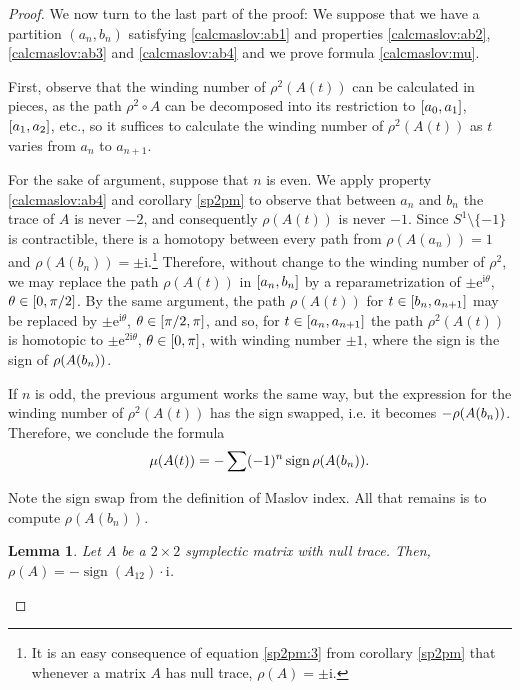 \documentclass{article}
\newtheorem{lemma}{Lemma}
\theoremstyle{nonumberplain}
\newtheorem{proof}{Proof}
\newcommand{\I}{\mathrm{i}}
\newcommand{\e}{\mathrm{e}}
\DeclareMathOperator{\sign}{sign}
\let\Im\relax
\DeclareMathOperator{\Im}{Im}
\begin{document}
\begin{proof}
\smallskip

We now turn to the last part of the proof: We suppose that we have a partition $(a_n, b_n)$ satisfying \eqref{calcmaslov:ab1} and properties \ref{calcmaslov:ab2}, \ref{calcmaslov:ab3} and \ref{calcmaslov:ab4} and we prove formula \eqref{calcmaslov:mu}.

First, observe that the winding number of $\rho^2(A(t))$ can be calculated in pieces, as the path $\rho^2 \circ A$ can be decomposed into its restriction to $\interval{a_0}{a_1}$, $\interval{a_1}{a_2}$, etc., so it suffices to calculate the winding number of $\rho^2(A(t))$ as $t$ varies from $a_n$ to $a_{n+1}$.

For the sake of argument, suppose that $n$ is even. We apply property \ref{calcmaslov:ab4} and corollary \ref{sp2pm} to observe that between $a_n$ and $b_n$ the trace of $A$ is never $-2$, and consequently $\rho(A(t))$ is never $-1$. Since $S^1 \setminus \{-1\}$ is contractible, there is a homotopy between every path from $\rho(A(a_n)) = 1$ and $\rho(A(b_n)) = \pm\I$.\footnote{It is an easy consequence of equation \eqref{sp2pm:3} from corollary \ref{sp2pm} that whenever a matrix $A$ has null trace, $\rho(A) = \pm \I$.} Therefore, without change to the winding number of $\rho^2$, we may replace the path $\rho(A(t))$ in $\interval{a_n}{b_n}$ by a reparametrization of $\pm \e^{\I \theta}$, $\theta \in \interval 0 {\pi/2}$. By the same argument, the path $\rho(A(t))$ for $t \in \interval{b_n}{a_{n+1}}$ may be replaced by $\pm \e^{\I \theta}$, $\theta \in \interval{\pi/2}\pi$, and so, for $t \in \interval{a_n}{a_{n+1}}$ the path $\rho^2(A(t))$ is homotopic to $\pm \e^{2 \I \theta}$, $\theta \in \interval 0 \pi$, with winding number $\pm 1$, where the sign is the sign of $\Im \rho(A(b_n))$.

If $n$ is odd, the previous argument works the same way, but the expression for the winding number of $\rho^2(A(t))$ has the sign swapped, i.e. it becomes $- \Im \rho(A(b_n))$. Therefore, we conclude the formula
\begin{equation}
\mu(A(t)) = -\sum (-1)^n \sign \Im \rho(A(b_n)).
\end{equation}

Note the sign swap from the definition of Maslov index. All that remains is to compute $\rho(A(b_n))$.

\begin{lemma}
Let $A$ be a $2 \times 2$ symplectic matrix with null trace. Then, $\rho(A) = -\sign(A_{12}) \cdot  \I$.
\end{lemma}


\end{proof}
\end{document}
